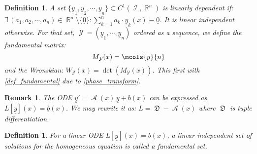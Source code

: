 \documentclass[12pt]{article}
\newcommand{\Exist}[1]{\exists\,{#1}:}
\DeclareMathOperator{\R}{\mathbb{R}}
\DeclareMathOperator{\I}{\mathcal{I}}
\DeclareMathOperator{\A}{\mathcal{A}}
\DeclareMathOperator{\Y}{\mathcal{Y}}
\DeclareMathOperator{\D}{\mathfrak{D}}
\newcommand{\tuple}[1]{\underline{#1}}
\newtheorem{definition}[theorem]{Definition}
\newtheorem{remark}[theorem]{Remark}
\begin{document}
\begin{definition}
  \label{def_fundamental_system}
  A set $\{\tuple{y}_1,\tuple{y}_2,\cdots,\tuple{y}_n\}\subset C^1(\I,\R^n)$ is linearly dependent if: $\Exist{(a_1,a_2,\cdots,a_n)\in\R^n\setminus\{\tuple{0}\}}\sum_{k=1}^n a_k\cdot \tuple{y}_k(x)\equiv\tuple{0}$. It is linear independent otherwise. For that set, $\Y=(\tuple{y}_1,\cdots,\tuple{y}_n)$ ordered as a sequence, we define the fundamental matrix: $$M_{\Y}(x)=\mcols{y}{n}$$ and the Wronskian: $W_{\Y}(x)=\det(M_{\Y}(x))$. This first with \ref{def_fundamental} due to \ref{phase_transform}.
\end{definition}

\begin{remark}
  The ODE $\tuple{y}'=\A(x)\,\tuple{y}+\tuple{b}(x)$ can be expressed as $L[\tuple{y}](x)=\tuple{b}(x)$. We may rewrite it as: $L=\D-\A(x)$ where $\D$ is tuple differentiation.
\end{remark}

\begin{definition}
  For a linear ODE $L[\tuple{y}](x)=\tuple{b}(x)$, a linear independent set of solutions for the homogeneous equation is called a fundamental set.
\end{definition}
\end{document}
